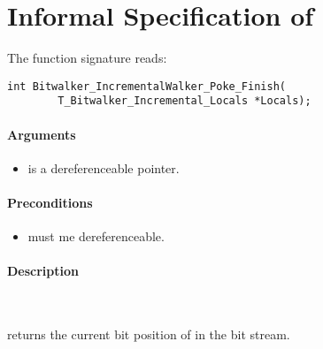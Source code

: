 
\clearpage

\section{Informal Specification of }

 The function signature reads:\\[1em]

\begin{lstlisting}[style=acsl-block]
int Bitwalker_IncrementalWalker_Poke_Finish(
        T_Bitwalker_Incremental_Locals *Locals);
\end{lstlisting}

\paragraph{Arguments}
\begin{itemize}
   \item  {} is a dereferenceable pointer.
\end{itemize}

\paragraph{Preconditions}
\begin{itemize}
    \item  {} must me dereferenceable.
\end{itemize}

\paragraph{Description}~

\pokefinish  returns the current bit position of in the bit stream.




